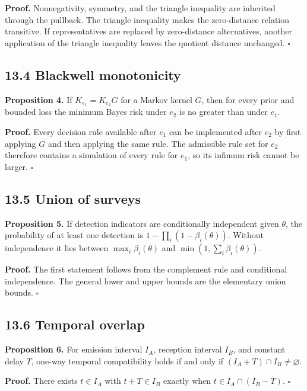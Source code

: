 \documentclass[11pt,a4paper]{article}
\begin{document}
\textbf{Proof.} Nonnegativity, symmetry, and the triangle inequality are inherited through the pullback. The triangle inequality makes the zero-distance relation transitive. If representatives are replaced by zero-distance alternatives, another application of the triangle inequality leaves the quotient distance unchanged. \(\square\)

\subsection{13.4 Blackwell monotonicity}\label{134-blackwell-monotonicity}

\textbf{Proposition 4.} If \(K_{e_1}=K_{e_2}G\) for a Markov kernel \(G\), then for every prior and bounded loss the minimum Bayes risk under \(e_2\) is no greater than under \(e_1\).

\textbf{Proof.} Every decision rule available after \(e_1\) can be implemented after \(e_2\) by first applying \(G\) and then applying the same rule. The admissible rule set for \(e_2\) therefore contains a simulation of every rule for \(e_1\), so its infimum risk cannot be larger. \(\square\)

\subsection{13.5 Union of surveys}\label{135-union-of-surveys}

\textbf{Proposition 5.} If detection indicators are conditionally independent given \(\theta\), the probability of at least one detection is \(1-\prod_i(1-\beta_i(\theta))\). Without independence it lies between \(\max_i\beta_i(\theta)\) and \(\min(1,\sum_i\beta_i(\theta))\).

\textbf{Proof.} The first statement follows from the complement rule and conditional independence. The general lower and upper bounds are the elementary union bounds. \(\square\)

\subsection{13.6 Temporal overlap}\label{136-temporal-overlap}

\textbf{Proposition 6.} For emission interval \(I_A\), reception interval \(I_B\), and constant delay \(T\), one-way temporal compatibility holds if and only if \((I_A+T)\cap I_B\ne\varnothing\).

\textbf{Proof.} There exists \(t\in I_A\) with \(t+T\in I_B\) exactly when \(t\in I_A\cap(I_B-T)\). \(\square\)
\end{document}
